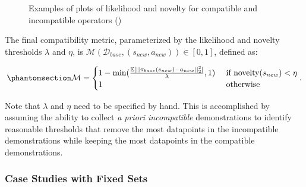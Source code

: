 \documentclass[
  letterpaper,
  numbers=noenddot,
  DIV=11]{scrreprt}
\theoremstyle{definition}
\theoremstyle{plain}
\theoremstyle{plain}
\theoremstyle{remark}
\begin{document}
\begin{figure}


\caption{\label{fig-likelihood_novelty}Examples of plots of likelihood
and novelty for compatible and incompatible operators
()}

\end{figure}%

The final compatibility metric, parameterized by the likelihood and
novelty thresholds \(\lambda\) and \(\eta\), is
\(\mathcal{M}(\mathcal{D}_{base}, (s_{new}, a_{new})) \in [0, 1]\),
defined as:

\begin{equation}\phantomsection\label{eq-eq3.63}{\begin{aligned}
    \mathcal{M} = \begin{cases} 
        1 - \min(\frac{\mathbb{E}[|| \pi_{base}(s_{new}) - a_{new} ||^2_2]}{\lambda}, 1) & \text{ if } \text{novelty}(s_{new}) < \eta \\
        1 & \text{ otherwise }
       \end{cases}.
\end{aligned}}\end{equation}

Note that \(\lambda\) and \(\eta\) need to be specified by hand. This is
accomplished by assuming the ability to collect \emph{a priori
incompatible} demonstrations to identify reasonable thresholds that
remove the most datapoints in the incompatible demonstrations while
keeping the most datapoints in the compatible demonstrations.

\subsubsection*{Case Studies with Fixed
Sets}\label{case-studies-with-fixed-sets}
\end{document}
